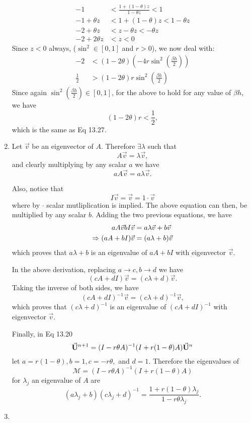 \documentclass[11pt]{article}
\def\f{\frac }
\newcommand{\bvec}[1]{\vec{ {\bf #1 } }}
\begin{document}
\begin{enumerate}
\begin{align*}
-1 & < \f{1+ (1-\theta) z  }{1-\theta z}  < 1 \\
-1+\theta z & < 1+ (1-\theta) z < 1-\theta z \\
-2+\theta z & < z-\theta z < -\theta z \\
-2+2\theta z & < z < 0 \end{align*}
Since $z<0$ always, ($\sin^2 \in [0,1]$ and $r>0$), we now deal with:
\begin{align*} -2& < (1-2\theta) \left ( -4r \sin ^2 \left (\f{\beta h}{2} \right ) \right )\\
\f{1}{2} & > (1-2\theta) r \sin ^2 \left (\f{\beta h}{2} \right )\end{align*}
Since again $\sin ^2 \left (\f{\beta h}{2} \right ) \in [0,1]$, for the above to hold for any value of $\beta h$, we have 
\[  (1-2\theta) r < \f{1}{2}, \]
which is the same as Eq 13.27.


\item Let $\vec{v}$ be an eigenvector of $A$.
Therefore $\exists \lambda $ such that
\[A\vec{v} = \lambda \vec{v},\]
and clearly multiplying by any scalar $a$ we have
\[aA\vec{v} = a\lambda \vec{v}.\]

Also, notice that 
\[ I\vec{v} = \vec{v} = 1\cdot \vec{v} \]
where by $\cdot$ scalar mutliplication is implied.
The above equation can then, be multiplied by any scalar $b$.
Adding the two previous equations, we have
\begin{align*} aA\vec{v} bI\vec{v}  &= a\lambda \vec{v} + b\vec{v}\\ \vspace{1mm}
\Rightarrow (aA+ bI)\vec{v}  &= (a\lambda +b) \vec{v}\end{align*}
which proves that $a\lambda +b$ is an eigenvalue of $aA+ bI$ with eigenvector $\vec{v}$.

In the above derivation, replacing $a \to c, b \to d$ we have
\[ (cA+ dI)\vec{v} = (c\lambda +d) \vec{v}.\]
Taking the inverse of both sides, we have
\[ (cA+ dI)^{-1}\vec{v} = (c\lambda +d)^{-1} \vec{v},\]
which proves that $(c\lambda +d)^{-1}$ is an eigenvalue of $(cA+ dI)^{-1}$ with eigenvector $\vec{v}$.

Finally, in Eq 13.20
\[ \bvec{U} ^{n+1}  = (I - r \theta A ) ^{-1} (I + r(1-\theta ) A) \bvec{U} ^n \]
let $a = r(1-\theta) , b = 1, c = -r\theta, $  and $d=1$.
Therefore the eigenvalues of 
\[ \mathcal{M} =  (I - r \theta A ) ^{-1} (I + r(1-\theta ) A) \]
for $\lambda _j$ an eigenvalue of $A$ are
\[ (a \lambda _j + b) (c\lambda _j + d) ^{-1}  = \f{1 + r(1-\theta) \lambda _j }{1 - r\theta \lambda _j}. \]

\item 



\end{enumerate}
\end{document}
